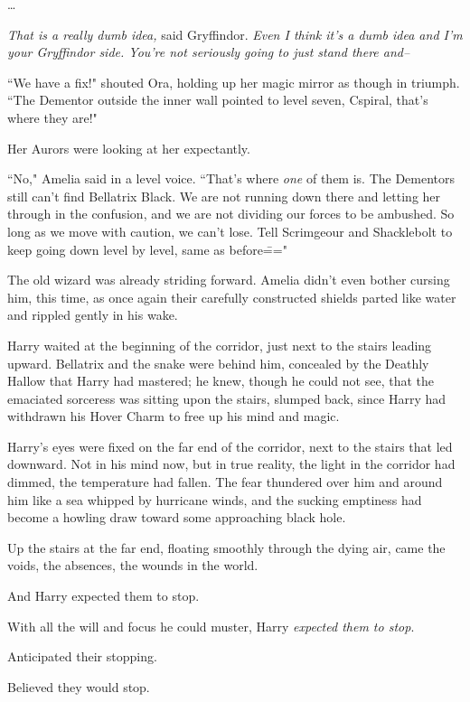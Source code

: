 {\ldots}

\emph{That is a really dumb idea,} said Gryffindor. \emph{Even I think it's a dumb idea and I'm your Gryffindor side. You're not seriously going to just stand there and\---}

\later

``We have a fix!" shouted Ora, holding up her magic mirror as though in triumph. ``The Dementor outside the inner wall pointed to level seven, C\?spiral, that's where they are!"

Her Aurors were looking at her expectantly.

``No," Amelia said in a level voice. ``That's where \emph{one} of them is. The Dementors still can't find Bellatrix Black. We are not running down there and letting her through in the confusion, and we are not dividing our forces to be ambushed. So long as we move with caution, we can't lose. Tell Scrimgeour and Shacklebolt to keep going down level by level, same as before\==="

The old wizard was already striding forward. Amelia didn't even bother cursing him, this time, as once again their carefully constructed shields parted like water and rippled gently in his wake.

\later

Harry waited at the beginning of the corridor, just next to the stairs leading upward. Bellatrix and the snake were behind him, concealed by the Deathly Hallow that Harry had mastered; he knew, though he could not see, that the emaciated sorceress was sitting upon the stairs, slumped back, since Harry had withdrawn his Hover Charm to free up his mind and magic.

Harry's eyes were fixed on the far end of the corridor, next to the stairs that led downward. Not in his mind now, but in true reality, the light in the corridor had dimmed, the temperature had fallen. The fear thundered over him and around him like a sea whipped by hurricane winds, and the sucking emptiness had become a howling draw toward some approaching black hole.

Up the stairs at the far end, floating smoothly through the dying air, came the voids, the absences, the wounds in the world.

And Harry expected them to stop.

With all the will and focus he could muster, Harry \emph{expected them to stop}.

Anticipated their stopping.

Believed they would stop.

